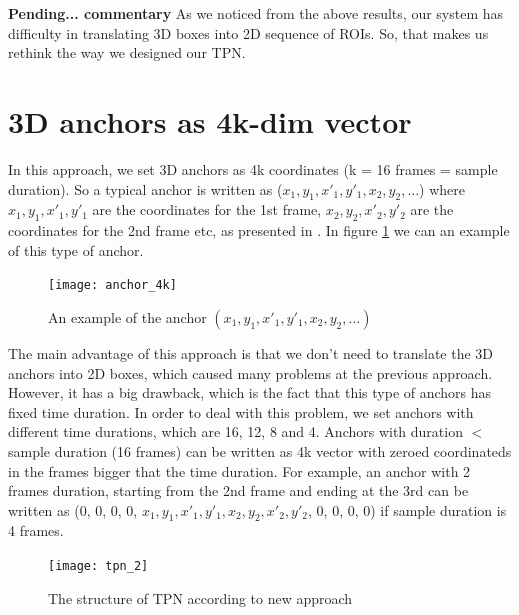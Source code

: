 \textbf{Pending... commentary}
As we noticed from the above results, our system has difficulty in translating 3D boxes into 2D sequence of ROIs. So, that makes us rethink the way we designed
our TPN.


\section{ 3D anchors as 4k-dim vector}
In this approach, we set 3D anchors as 4k coordinates (k = 16 frames = sample duration). So a typical anchor is written as ($x_1, y_1, x'_1, y'_1, x_2, y_2, ...$)
where $x_1, y_1, x'_1, y'_1 $ are the coordinates for the 1st frame, $x_2, y_2, x'_2, y'_2$ are the coordinates for the 2nd frame etc, as presented in \cite{DBLP:journals/corr/abs-1712-09184}.
In figure \ref{fig:anchor_4k} we can an example of this type of anchor.

\begin{figure}[h]
  \centering
  \texttt{[image: anchor\_4k]}
  \caption{An example of the anchor $(x_1,y_1,x'_1,y'_1,x_2,y_2, ...)$}
  \label{fig:anchor_4k}
\end{figure}

The main advantage of this approach is that we don't need to translate the 3D anchors into 2D boxes, which caused many problems at the previous approach.
However, it has a big drawback, which is the fact that this type of anchors has fixed time duration.
In order to deal with this problem, we set anchors with different time durations, which are 16, 12, 8 and 4.
Anchors with duration $ < $ sample duration (16 frames) can be written as 4k vector with zeroed coordinateds in the frames bigger that the time duration. For example, an anchor with
2 frames duration, starting from the 2nd frame and ending at the 3rd can be written as (0, 0, 0, 0, $x_1, y_1, x'_1, y'_1, x_2, y_2, x'_2, y'_2$, 0, 0, 0, 0) if sample
duration is 4 frames. 

\begin{figure}[h]
  \centering
  \texttt{[image: tpn\_2]}
  \caption{The structure of TPN according to new approach}
  \label{fig:New_structure}
\end{figure}

